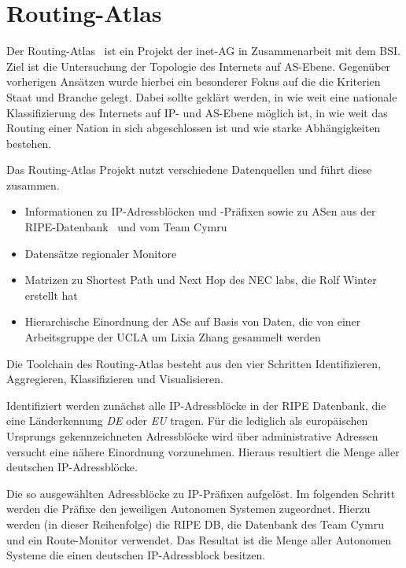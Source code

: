 \section{Routing-Atlas}\label{sec:routingatlas}


Der Routing-Atlas~\cite{wsbh-envgi-12} ist ein Projekt der inet-AG in Zusammenarbeit mit dem BSI.
Ziel ist die Untersuchung der Topologie des Internets auf AS-Ebene.
Gegenüber vorherigen Ansätzen wurde hierbei ein besonderer Fokus auf die die Kriterien Staat und Branche gelegt.
Dabei sollte geklärt werden, in wie weit eine nationale Klassifizierung des Internets auf IP- und AS-Ebene möglich ist, in wie weit das Routing einer Nation in sich abgeschlossen ist und wie starke Abhängigkeiten bestehen.

Das Routing-Atlas Projekt nutzt verschiedene Datenquellen und führt diese zusammen.
\begin{itemize}
  \item Informationen zu IP-Adressblöcken und -Präfixen sowie zu ASen aus der RIPE-Datenbank~\cite{ripe-db} und vom Team Cymru~\cite{cymru}
  \item Datensätze regionaler Monitore~\cite{ripe-ris}
  \item Matrizen zu Shortest Path und Next Hop des NEC labs, die Rolf Winter erstellt hat~\cite{neclab-topology, Winter:2009:MIR:1577959.1577976}
  \item Hierarchische Einordnung der ASe auf Basis von Daten, die von einer Arbeitsgruppe der UCLA um Lixia Zhang gesammelt werden~\cite{ucla-topology, Zhang:2005:CIA:1052812.1052825}
\end{itemize}

%
Die Toolchain des Routing-Atlas besteht aus den vier Schritten Identifizieren, Aggregieren, Klassifizieren und Visualisieren.

Identifiziert werden zunächst alle IP-Adressblöcke in der RIPE Datenbank, die eine Länderkennung \emph{DE} oder \emph{EU} tragen.
Für die lediglich als europäischen Ursprungs gekennzeichneten Adressblöcke wird über administrative Adressen versucht eine nähere Einordnung vorzunehmen.
Hieraus resultiert die Menge aller deutschen IP-Adressblöcke.

Die so ausgewählten Adressblöcke zu IP-Präfixen aufgelöst.
Im folgenden Schritt werden die Präfixe den jeweiligen Autonomen Systemen zugeordnet.
Hierzu werden (in dieser Reihenfolge) die RIPE DB, die Datenbank des Team Cymru und ein Route-Monitor verwendet.
Das Resultat ist die Menge aller Autonomen Systeme die einen deutschen IP-Adressblock besitzen.

